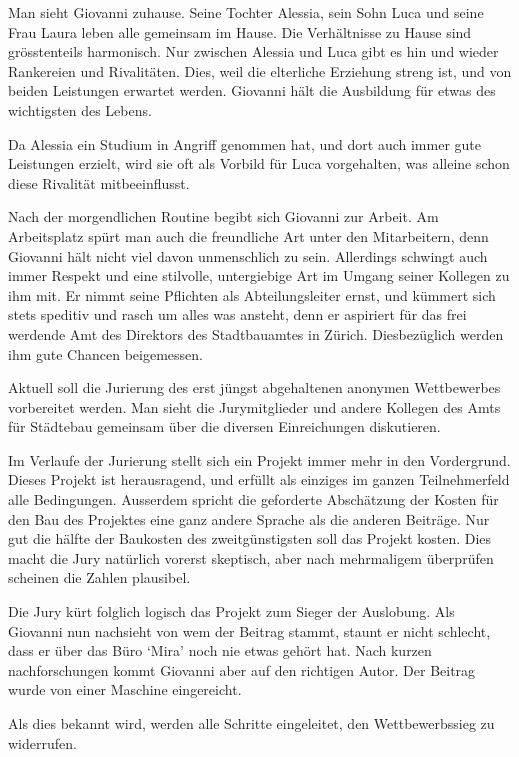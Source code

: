 \documentclass[11pt,a4paper,ngerman]{scrreprt}
\begin{document}
Man sieht Giovanni zuhause. Seine Tochter Alessia, sein Sohn Luca und seine Frau
Laura leben alle gemeinsam im Hause. Die Verhältnisse zu Hause sind
grösstenteils harmonisch. Nur zwischen Alessia und Luca gibt es hin und wieder
Rankereien und Rivalitäten. Dies, weil die elterliche Erziehung streng ist, und
von beiden Leistungen erwartet werden. Giovanni hält die Ausbildung für etwas
des wichtigsten des Lebens.

Da Alessia ein Studium in Angriff genommen hat, und dort auch immer gute
Leistungen erzielt, wird sie oft als Vorbild für Luca vorgehalten, was alleine
schon diese Rivalität mitbeeinflusst.

Nach der morgendlichen Routine begibt sich Giovanni zur Arbeit. Am Arbeitsplatz
spürt man auch die freundliche Art unter den Mitarbeitern, denn Giovanni hält
nicht viel davon unmenschlich zu sein. Allerdings schwingt auch immer Respekt
und eine stilvolle, untergiebige Art im Umgang seiner Kollegen zu ihm mit. Er
nimmt seine Pflichten als Abteilungsleiter ernst, und kümmert sich stets
speditiv und rasch um alles was ansteht, denn er aspiriert für das frei werdende
Amt des Direktors des Stadtbauamtes in Zürich. Diesbezüglich werden ihm gute
Chancen beigemessen.

Aktuell soll die Jurierung des erst jüngst abgehaltenen anonymen Wettbewerbes
vorbereitet werden. Man sieht die Jurymitglieder und andere Kollegen des Amts
für Städtebau gemeinsam über die diversen Einreichungen diskutieren.

Im Verlaufe der Jurierung stellt sich ein Projekt immer mehr in den
Vordergrund. Dieses Projekt ist herausragend, und erfüllt als einziges im ganzen
Teilnehmerfeld alle Bedingungen. Ausserdem spricht die geforderte Abschätzung
der Kosten für den Bau des Projektes eine ganz andere Sprache als die anderen
Beiträge. Nur gut die hälfte der Baukosten des zweitgünstigsten soll das Projekt
kosten. Dies macht die Jury natürlich vorerst skeptisch, aber nach mehrmaligem
überprüfen scheinen die Zahlen plausibel.

Die Jury kürt folglich logisch das Projekt zum Sieger der Auslobung. Als
Giovanni nun nachsieht von wem der Beitrag stammt, staunt er nicht schlecht,
dass er über das Büro `Mira' noch nie etwas gehört hat. Nach kurzen
nachforschungen kommt Giovanni aber auf den richtigen Autor. Der Beitrag wurde
von einer Maschine eingereicht.

Als dies bekannt wird, werden alle Schritte eingeleitet, den Wettbewerbssieg zu
widerrufen.
\end{document}
